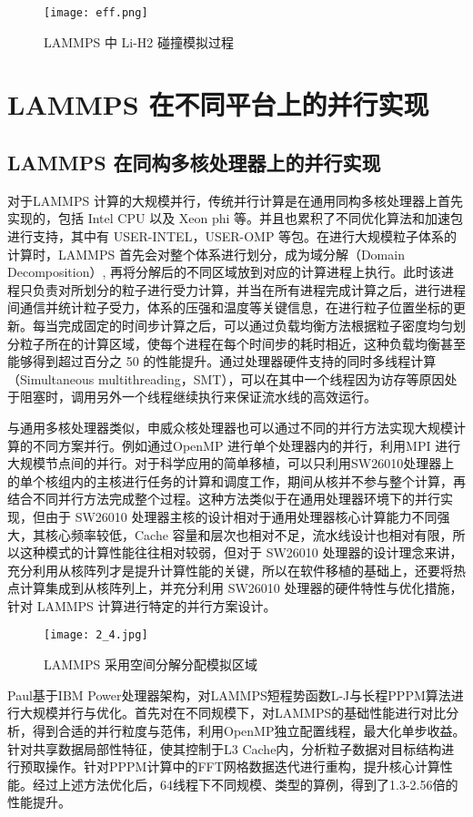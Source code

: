  \begin{figure}[h]
  \centering
  \texttt{[image: eff.png]}
  \caption{LAMMPS 中 Li-H2 碰撞模拟过程}
\end{figure}

\section{LAMMPS 在不同平台上的并行实现}
\subsection{LAMMPS 在同构多核处理器上的并行实现}
对于LAMMPS 计算的大规模并行，传统并行计算是在通用同构多核处理器上首先实现的，包括 Intel CPU 以及 Xeon phi 等。并且也累积了不同优化算法和加速包进行支持，其中有 USER-INTEL，USER-OMP 等包。在进行大规模粒子体系的计算时，LAMMPS 首先会对整个体系进行划分，成为域分解（Domain Decomposition）, 再将分解后的不同区域放到对应的计算进程上执行。此时该进程只负责对所划分的粒子进行受力计算，并当在所有进程完成计算之后，进行进程间通信并统计粒子受力，体系的压强和温度等关键信息，在进行粒子位置坐标的更新。每当完成固定的时间步计算之后，可以通过负载均衡方法根据粒子密度均匀划分粒子所在的计算区域，使每个进程在每个时间步的耗时相近，这种负载均衡甚至能够得到超过百分之 50 的性能提升。通过处理器硬件支持的同时多线程计算（Simultaneous multithreading，SMT），可以在其中一个线程因为访存等原因处于阻塞时，调用另外一个线程继续执行来保证流水线的高效运行。

与通用多核处理器类似，申威众核处理器也可以通过不同的并行方法实现大规模计算的不同方案并行。例如通过OpenMP 进行单个处理器内的并行，利用MPI 进行大规模节点间的并行。对于科学应用的简单移植，可以只利用SW26010处理器上的单个核组内的主核进行任务的计算和调度工作，期间从核并不参与整个计算，再结合不同并行方法完成整个过程。这种方法类似于在通用处理器环境下的并行实现，但由于 SW26010 处理器主核的设计相对于通用处理器核心计算能力不同强大，其核心频率较低，Cache 容量和层次也相对不足，流水线设计也相对有限，所以这种模式的计算性能往往相对较弱，但对于 SW26010 处理器的设计理念来讲，充分利用从核阵列才是提升计算性能的关键，所以在软件移植的基础上，还要将热点计算集成到从核阵列上，并充分利用 SW26010 处理器的硬件特性与优化措施，针对 LAMMPS 计算进行特定的并行方案设计。

 \begin{figure}[h]
  \centering
  \texttt{[image: 2\_4.jpg]}
  \caption{LAMMPS 采用空间分解分配模拟区域}
 \end{figure}

Paul\cite{coffman2014lammps}基于IBM Power处理器架构，对LAMMPS短程势函数L-J与长程PPPM算法进行大规模并行与优化。首先对在不同规模下，对LAMMPS的基础性能进行对比分析，得到合适的并行粒度与范伟，利用OpenMP独立配置线程，最大化单步收益。针对共享数据局部性特征，使其控制于L3 Cache内，分析粒子数据对目标结构进行预取操作。针对PPPM计算中的FFT网格数据迭代进行重构，提升核心计算性能。经过上述方法优化后，64线程下不同规模、类型的算例，得到了1.3-2.56倍的性能提升。

